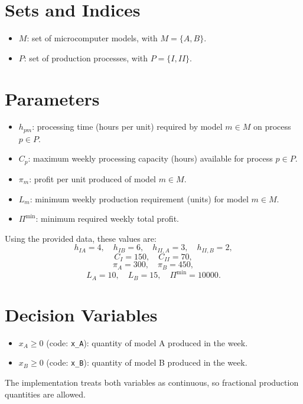 \section*{Sets and Indices}

\begin{itemize}
    \item $M$: set of microcomputer models, with $M=\{A,B\}$.
    \item $P$: set of production processes, with $P=\{I,II\}$.
\end{itemize}

\section*{Parameters}

\begin{itemize}
    \item $h_{pm}$: processing time (hours per unit) required by model $m \in M$ on process $p \in P$.
    \item $C_p$: maximum weekly processing capacity (hours) available for process $p \in P$.
    \item $\pi_m$: profit per unit produced of model $m \in M$.
    \item $L_m$: minimum weekly production requirement (units) for model $m \in M$.
    \item $\Pi^{\min}$: minimum required weekly total profit.
\end{itemize}

Using the provided data, these values are:
\[
h_{IA}=4,\quad h_{IB}=6,\quad h_{II,A}=3,\quad h_{II,B}=2,
\]
\[
C_I=150,\quad C_{II}=70,
\]
\[
\pi_A=300,\quad \pi_B=450,
\]
\[
L_A=10,\quad L_B=15,\quad \Pi^{\min}=10000.
\]

\section*{Decision Variables}

\begin{itemize}
    \item $x_A \ge 0$ (code: \texttt{x\_A}): quantity of model A produced in the week.
    \item $x_B \ge 0$ (code: \texttt{x\_B}): quantity of model B produced in the week.
\end{itemize}

The implementation treats both variables as continuous, so fractional production quantities are allowed.

